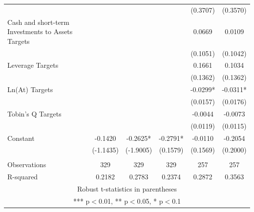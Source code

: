 \documentclass[12pt]{article}
\begin{document}
\begin{table}[ht]
\begin{adjustbox}{height=10cm, max width=\textwidth}
\begin{tabular}{lccccc}
			 &  &  &  & (0.3707) & (0.3570) \\
			Cash and short-term Investments to Assets Targets &  &  &  & 0.0669 & 0.0109 \\
			 &  &  &  & (0.1051) & (0.1042) \\
			Leverage Targets &  &  &  & 0.1661 & 0.1034 \\
			 &  &  &  & (0.1362) & (0.1362) \\
			Ln(At) Targets &  &  &  & -0.0299* & -0.0311* \\
			 &  &  &  & (0.0157) & (0.0176) \\
			Tobin's Q Targets &  &  &  & -0.0044 & -0.0073 \\
			 &  &  &  & (0.0119) & (0.0115) \\
			Constant & -0.1420 & -0.2625* & -0.2791* & -0.0110 & -0.2054 \\
			 & (-1.1435) & (-1.9005) & (0.1579) & (0.1569) & (0.2000) \\
			 &  &  &  &  &  \\
			Observations & 329 & 329 & 329 & 257 & 257 \\
			 R-squared & 0.2182 & 0.2783 & 0.2374 & 0.2872 & 0.3563 \\ \hline
			\multicolumn{6}{c}{ Robust t-statistics in parentheses} \\
			\multicolumn{6}{c}{ *** p$<$0.01, ** p$<$0.05, * p$<$0.1} \\
			\end{tabular}
					   
	\end{adjustbox}
	\end{table}
\end{document}
